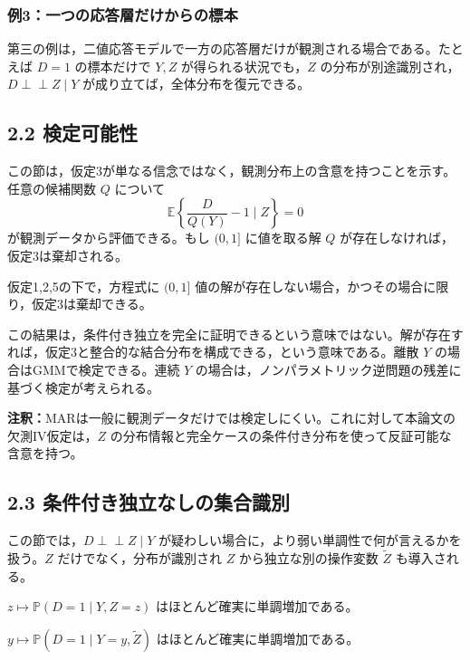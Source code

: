 \documentclass[10pt,a4paper]{article}
\newcommand{\indep}{\mathrel{\perp\!\!\!\perp}}
\newcommand{\E}{\mathbb{E}}
\newcommand{\Prb}{\mathbb{P}}
\newcommand{\note}[1]{\par\smallskip\noindent\textbf{注釈：}#1\par\smallskip}
\begin{document}
\subsubsection{例3：一つの応答層だけからの標本}

第三の例は，二値応答モデルで一方の応答層だけが観測される場合である。たとえば $D=1$ の標本だけで $Y,Z$ が得られる状況でも，$Z$ の分布が別途識別され，$D\indep Z\mid Y$ が成り立てば，全体分布を復元できる。

\subsection{2.2 検定可能性}

この節は，仮定3が単なる信念ではなく，観測分布上の含意を持つことを示す。任意の候補関数 $Q$ について
\[
\E\left\{\frac{D}{Q(Y)}-1\mid Z\right\}=0
\]
が観測データから評価できる。もし $(0,1]$ に値を取る解 $Q$ が存在しなければ，仮定3は棄却される。

\begin{description}[leftmargin=3.2em]
\item[定理2.4] 仮定1,2,5の下で，方程式に $(0,1]$ 値の解が存在しない場合，かつその場合に限り，仮定3は棄却できる。
\end{description}

この結果は，条件付き独立を完全に証明できるという意味ではない。解が存在すれば，仮定3と整合的な結合分布を構成できる，という意味である。離散 $Y$ の場合はGMMで検定できる。連続 $Y$ の場合は，ノンパラメトリック逆問題の残差に基づく検定が考えられる。

\note{MARは一般に観測データだけでは検定しにくい。これに対して本論文の欠測IV仮定は，$Z$ の分布情報と完全ケースの条件付き分布を使って反証可能な含意を持つ。}

\subsection{2.3 条件付き独立なしの集合識別}

この節では，$D\indep Z\mid Y$ が疑わしい場合に，より弱い単調性で何が言えるかを扱う。$Z$ だけでなく，分布が識別され $Z$ から独立な別の操作変数 $\widetilde Z$ も導入される。

\begin{description}[leftmargin=3.2em]
\item[仮定3'] $z\mapsto \Prb(D=1\mid Y,Z=z)$ はほとんど確実に単調増加である。
\item[仮定6] $y\mapsto \Prb(D=1\mid Y=y,\widetilde Z)$ はほとんど確実に単調増加である。
\end{description}
\end{document}
